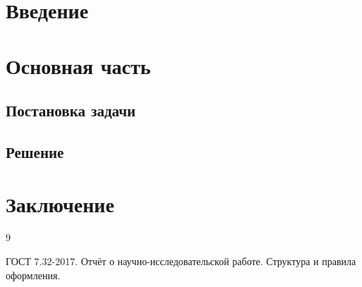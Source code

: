 \documentclass[12pt,a4paper]{extreport}
\begin{document}


\tableofcontents
\clearpage

\chapter*{Введение}

\chapter{Основная часть}
\section{Постановка задачи}

\section{Решение}

\chapter*{Заключение}

\begin{thebibliography}{9}
 ГОСТ 7.32-2017. Отчёт о научно-исследовательской работе. Структура и правила оформления.
\end{thebibliography}
\end{document}
